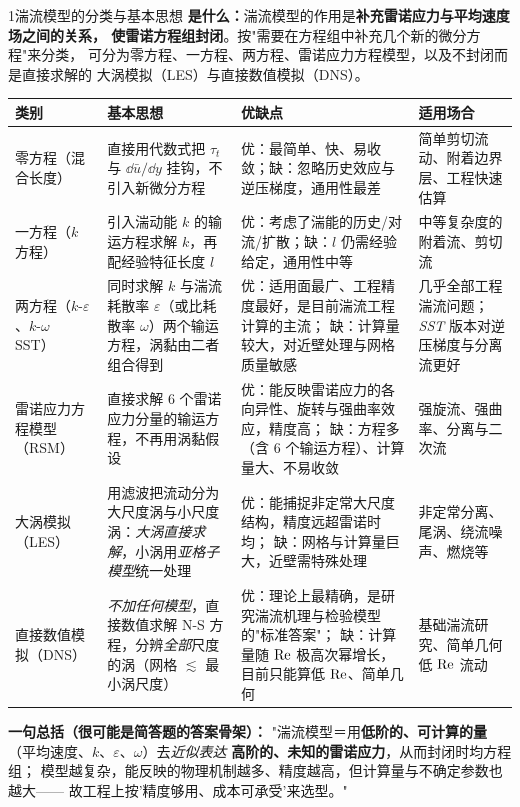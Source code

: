 \begin{kaodian}{1}{湍流模型的分类与基本思想}
\textbf{是什么：}湍流模型的作用是\textbf{补充雷诺应力与平均速度场之间的关系，
使雷诺方程组封闭}。按"需要在方程组中补充几个新的微分方程"来分类，
可分为零方程、一方程、两方程、雷诺应力方程模型，以及不封闭而是直接求解的
大涡模拟（LES）与直接数值模拟（DNS）。

\begin{center}
\small
\begin{tabularx}{\textwidth}{@{}l>{\raggedright\arraybackslash}X>{\raggedright\arraybackslash}X>{\raggedright\arraybackslash}X@{}}
\toprule
类别 & 基本思想 & 优缺点 & 适用场合 \\
\midrule
零方程（混合长度） &
直接用代数式把 $\tau_t$ 与 $\dd\bar u/\dd y$ 挂钩，不引入新微分方程 &
优：最简单、快、易收敛；缺：忽略历史效应与逆压梯度，通用性最差 &
简单剪切流动、附着边界层、工程快速估算 \\
一方程（$k$ 方程） &
引入湍动能 $k$ 的输运方程求解 $k$，再配经验特征长度 $l$ &
优：考虑了湍能的历史/对流/扩散；缺：$l$ 仍需经验给定，通用性中等 &
中等复杂度的附着流、剪切流 \\
两方程（$k$-$\varepsilon$、$k$-$\omega$ SST） &
同时求解 $k$ 与湍流耗散率 $\varepsilon$（或比耗散率 $\omega$）两个输运方程，涡黏由二者组合得到 &
优：适用面最广、工程精度最好，是目前湍流工程计算的主流；
缺：计算量较大，对近壁处理与网格质量敏感 &
几乎全部工程湍流问题；\emph{SST} 版本对逆压梯度与分离流更好 \\
雷诺应力方程模型（RSM） &
直接求解 6 个雷诺应力分量的输运方程，不再用涡黏假设 &
优：能反映雷诺应力的各向异性、旋转与强曲率效应，精度高；
缺：方程多（含 6 个输运方程）、计算量大、不易收敛 &
强旋流、强曲率、分离与二次流 \\
大涡模拟（LES） &
用滤波把流动分为大尺度涡与小尺度涡：\emph{大涡直接求解}，小涡用\emph{亚格子模型}统一处理 &
优：能捕捉非定常大尺度结构，精度远超雷诺时均；
缺：网格与计算量巨大，近壁需特殊处理 &
非定常分离、尾涡、绕流噪声、燃烧等 \\
直接数值模拟（DNS） &
\emph{不加任何模型}，直接数值求解 N-S 方程，分辨\emph{全部}尺度的涡（网格 $\lesssim$ 最小涡尺度） &
优：理论上最精确，是研究湍流机理与检验模型的"标准答案"；
缺：计算量随 $\mathrm{Re}$ 极高次幂增长，目前只能算低 $\mathrm{Re}$、简单几何 &
基础湍流研究、简单几何低 $\mathrm{Re}$ 流动 \\
\bottomrule
\end{tabularx}
\end{center}

\textbf{一句总括（很可能是简答题的答案骨架）：}
"湍流模型＝用\textbf{低阶的、可计算的量}（平均速度、$k$、$\varepsilon$、$\omega$）去\emph{近似表达}
\textbf{高阶的、未知的雷诺应力}，从而封闭时均方程组；
模型越复杂，能反映的物理机制越多、精度越高，但计算量与不确定参数也越大——
故工程上按'精度够用、成本可承受'来选型。"


\end{kaodian}
